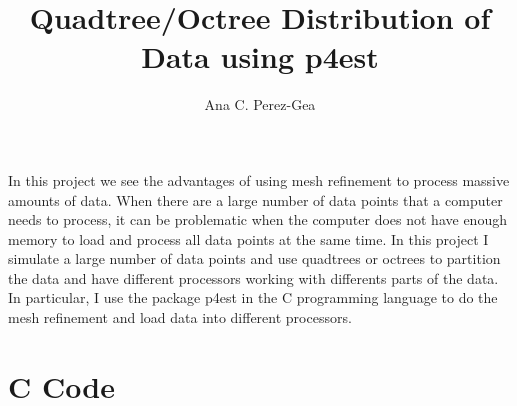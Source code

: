 \documentclass[12pt,letterpaper]{article}
\title{Quadtree/Octree Distribution of Data using p4est}
\author{Ana C. Perez-Gea}
\begin{document}
\maketitle

In this project we see the advantages of using mesh refinement to process massive amounts of data. When there are a large number of data points that a computer needs to process, it can be problematic when the computer does not have enough memory to load and process all data points at the same time. In this project I simulate a large number of data points and use quadtrees or octrees to partition the data and have different processors working with differents parts of the data.  In particular, I use the package p4est in the C programming language to do the mesh refinement and load data into different processors.

\section{C Code}


\end{document}
